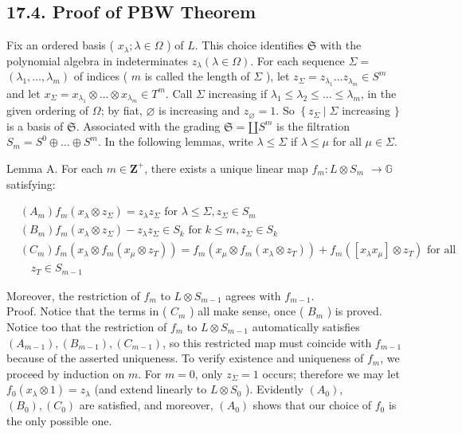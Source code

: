 \documentclass[10pt]{article}
\begin{document}
\subsection*{17.4. Proof of PBW Theorem}
Fix an ordered basis ( $x_{\lambda} ; \lambda \in \Omega$ ) of $L$. This choice identifies $\mathfrak{S}$ with the polynomial algebra in indeterminates $z_{\lambda}(\lambda \in \Omega)$. For each sequence $\Sigma=$ $\left(\lambda_{1}, \ldots, \lambda_{m}\right)$ of indices ( $m$ is called the length of $\Sigma$ ), let $z_{\Sigma}=z_{\lambda_{1}} \ldots z_{\lambda_{m}} \in S^{m}$ and let $x_{\Sigma}=x_{\lambda_{1}} \otimes \ldots \otimes x_{\lambda_{m}} \in T^{m}$. Call $\Sigma$ increasing if $\lambda_{1} \leq \lambda_{2} \leq \ldots \leq \lambda_{m}$, in the given ordering of $\Omega$; by fiat, $\varnothing$ is increasing and $z_{\varnothing}=1$. So $\left\{z_{\Sigma} \mid \Sigma\right.$ increasing $\}$ is a basis of $\mathfrak{S}$. Associated with the grading $\mathfrak{S}=\amalg S^{m}$ is the filtration $S_{m}=S^{0} \oplus \ldots \oplus S^{m}$. In the following lemmas, write $\lambda \leq \Sigma$ if $\lambda \leq \mu$ for all $\mu \in \Sigma$.

Lemma A. For each $m \in \mathbf{Z}^{+}$, there exists a unique linear map $f_{m}: L \otimes S_{m}$ $\rightarrow \mathbb{G}$ satisfying:

$$
\begin{aligned}
& \left(A_{m}\right) f_{m}\left(x_{\lambda} \otimes z_{\Sigma}\right)=z_{\lambda} z_{\Sigma} \text { for } \lambda \leq \Sigma, z_{\Sigma} \in S_{m} \\
& \left(B_{m}\right) f_{m}\left(x_{\lambda} \otimes z_{\Sigma}\right)-z_{\lambda} z_{\Sigma} \in S_{k} \text { for } k \leq m, z_{\Sigma} \in S_{k} \\
& \left(C_{m}\right) f_{m}\left(x_{\lambda} \otimes f_{m}\left(x_{\mu} \otimes z_{T}\right)\right)=f_{m}\left(x_{\mu} \otimes f_{m}\left(x_{\lambda} \otimes z_{T}\right)\right)+f_{m}\left(\left[x_{\lambda} x_{\mu}\right] \otimes z_{T}\right) \text { for all } \\
& \quad z_{T} \in S_{m-1}
\end{aligned}
$$

Moreover, the restriction of $f_{m}$ to $L \otimes S_{m-1}$ agrees with $f_{m-1}$.\\
Proof. Notice that the terms in ( $C_{m}$ ) all make sense, once ( $B_{m}$ ) is proved. Notice too that the restriction of $f_{m}$ to $L \otimes S_{m-1}$ automatically satisfies $\left(A_{m-1}\right),\left(B_{m-1}\right),\left(C_{m-1}\right)$, so this restricted map must coincide with $f_{m-1}$ because of the asserted uniqueness. To verify existence and uniqueness of $f_{m}$, we proceed by induction on $m$. For $m=0$, only $z_{\Sigma}=1$ occurs; therefore we may let $f_{0}\left(x_{\lambda} \otimes 1\right)=z_{\lambda}$ (and extend linearly to $L \otimes S_{0}$ ). Evidently $\left(A_{0}\right)$, $\left(B_{0}\right),\left(C_{0}\right)$ are satisfied, and moreover, $\left(A_{0}\right)$ shows that our choice of $f_{0}$ is the only possible one.
\end{document}
